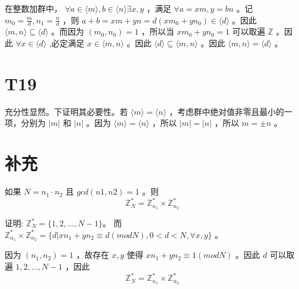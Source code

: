 \documentclass[fontset=windows]{article}
\begin{document}
在整数加群中， $\forall a \in \langle m \rangle,b \in \langle n \rangle \exists x,y$ ，满足 $\forall a = xm, y = bn$ 。记 $m_0 = \frac{m}{d} , n_1 = \frac{n}{d} $ ，则 $a + b = xm + yn = d(xm_0 + yn_0) \in \langle d \rangle$ 。因此 $\langle m,n \rangle \subseteq \langle d \rangle$ 。而因为 $(m_0,n_0) = 1$ ，所以当 $xm_0 + yn_0 = 1$ 可以取遍 $\mathbb{Z}$ 。因此 $\forall x \in \langle d \rangle$ ,必定满足 $x \in \langle m,n \rangle$ 。因此 $\langle d \rangle \subseteq \langle m,n \rangle$ 。因此 $\langle m,n \rangle = \langle d \rangle$ 。


\section*{T19}

充分性显然。下证明其必要性。若 $\langle m \rangle = \langle n \rangle$ ，考虑群中绝对值非零且最小的一项，分别为 $|m|$ 和 $|n|$ 。因为 $\langle m \rangle = \langle n \rangle$ ，所以 $|m| = |n|$ ，所以 $m = \pm n$ 。

\section*{补充}

如果 $N = n_1 \cdot n_2$ 且 $gcd(n1,n2) = 1$ 。则 
$$\mathbb{Z}_N^{*} = \mathbb{Z}_{n_1}^{*} \times \mathbb{Z}_{n_2}^{*}$$

证明: $\mathbb{Z}_N^{*} = \{1,2,\dots,N -1\}$。
而  $\mathbb{Z}_{n_1}^{*} \times \mathbb{Z}_{n_2}^{*} = \{d | xn_1 + yn_2 \equiv d (mod N) , 0 < d < N ,  \forall x,y\} $ 。

因为 $ (n_1,n_2) = 1 $ ，故存在 $x,y$ 使得 $xn_1 + yn_2 \equiv 1 (mod N)$ 。因此 $d$ 可以取遍 $1,2,\dots,N-1$ ，因此 $$\mathbb{Z}_N^{*} = \mathbb{Z}_{n_1}^{*} \times \mathbb{Z}_{n_2}^{*}$$
\end{document}
